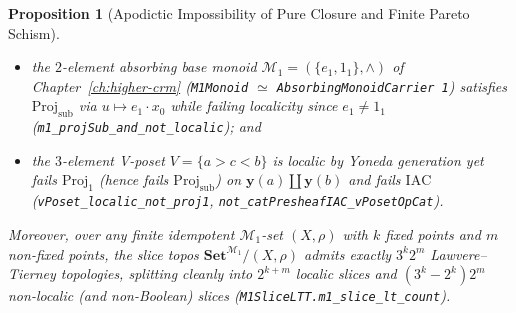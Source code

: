 \documentclass[10pt,twoside,openright]{book}
\theoremstyle{crmplain}
\newtheorem{proposition}[theorem]{Proposition}
\theoremstyle{crmdef}
\theoremstyle{crmremark}
\begin{document}
\begin{proposition}[Apodictic Impossibility of Pure Closure and Finite Pareto Schism]
\begin{enumerate}[label=\textup{(\roman*)},leftmargin=2.0em]
  \begin{itemize}[leftmargin=1.4em]
    \item the $2$-element absorbing base monoid $\mathcal{M}_1 = (\{e_1, 1_1\}, \wedge)$ of Chapter~\ref{ch:higher-crm} (\texttt{M1Monoid} $\simeq$ \texttt{AbsorbingMonoidCarrier 1}) satisfies $\mathrm{Proj}_{\mathrm{sub}}$ via $u \mapsto e_1 \cdot x_0$ while failing localicity since $e_1 \neq 1_1$ (\texttt{m1\_\allowbreak projSub\_\allowbreak and\_\allowbreak not\_\allowbreak localic}); and
    \item the $3$-element V-poset $V = \{a > c < b\}$ is localic by Yoneda generation yet fails $\mathrm{Proj}_1$ (hence fails $\mathrm{Proj}_{\mathrm{sub}}$) on $\mathbf{y}(a) \amalg \mathbf{y}(b)$ and fails $\mathrm{IAC}$ (\texttt{vPoset\_\allowbreak localic\_\allowbreak not\_\allowbreak proj1}, \texttt{not\_\allowbreak catPresheafIAC\_\allowbreak vPosetOpCat}).
  \end{itemize}
  Moreover, over any finite idempotent $\mathcal{M}_1$-set $(X, \rho)$ with $k$ fixed points and $m$ non-fixed points, the slice topos $\mathbf{Set}^{\mathcal{M}_1}/(X, \rho)$ admits exactly $3^k 2^m$ Lawvere--Tierney topologies, splitting cleanly into $2^{k+m}$ localic slices and $(3^k - 2^k) 2^m$ non-localic (and non-Boolean) slices (\texttt{M1SliceLTT.\allowbreak m1\_\allowbreak slice\_\allowbreak lt\_\allowbreak count}).
\end{enumerate}
\end{proposition}
\end{document}
